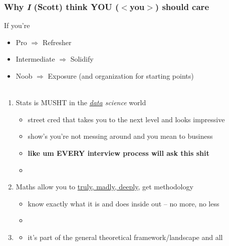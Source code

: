 \documentclass[xcolor={dvipsnames}]{beamer}
\begin{document}
\frame
{
\normalsize
 \frametitle{Why \emph{I} (Scott) think YOU ($<$you$>$) should care}

If you're
\begin{itemize}
\item Pro $\Longrightarrow$ Refresher
\item Intermediate $\Longrightarrow$ Solidify 
\item Noob $\Longrightarrow$ Exposure (and organization for starting points)\\${}$
\end{itemize}


\begin{enumerate}
\item<2-> Stats is MUSHT in the \emph{\underline{data} science} world 
\begin{itemize}
\item street cred that takes you to the next level and looks impressive
\item show's you're not messing around and you mean to business 
\item \textbf{like um EVERY interview process will ask this shit}
\item[]
\end{itemize}
\item<3-> Maths allow you to \underline{truly, madly, deeply}, get methodology
\begin{itemize}
\item know exactly what it is and does inside out -- no more, no less
\item[]
\end{itemize}
\item<4-> 
\vspace{-1em}
\begin{itemize}
\item it's part of the general theoretical framework/landscape and all
\end{itemize}
\end{enumerate}
}
\end{document}
